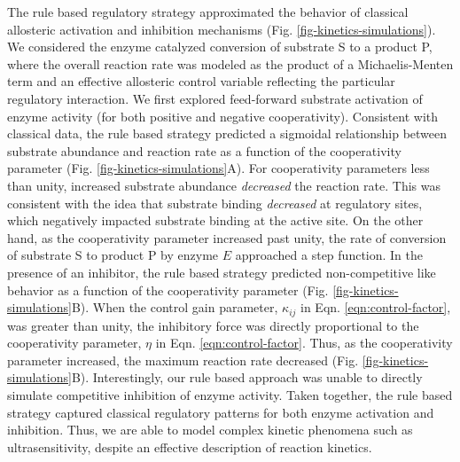 \documentclass[12pt]{article}
\begin{document}
The rule based regulatory strategy approximated the behavior of classical allosteric activation and inhibition mechanisms (Fig. \ref{fig-kinetics-simulations}).  
We considered the enzyme catalyzed conversion of substrate S to a product P, where the overall reaction rate was modeled as the product of a Michaelis-Menten term and an effective 
allosteric control variable reflecting the particular regulatory interaction.
We first explored feed-forward substrate activation of enzyme activity (for both positive and negative cooperativity). 
Consistent with classical data, the rule based strategy predicted a sigmoidal relationship between substrate abundance 
and reaction rate as a function of the cooperativity parameter (Fig. \ref{fig-kinetics-simulations}A). 
For cooperativity parameters less than unity, increased substrate abundance \textit{decreased} the reaction rate. This was consistent with the idea that
substrate binding \textit{decreased} at regulatory sites, which negatively impacted substrate binding at the active site. 
On the other hand, as the cooperativity parameter increased past unity, the rate of conversion of substrate S to product P by enzyme $E$ approached a step function.
In the presence of an inhibitor, the rule based strategy predicted non-competitive like behavior as a function of the 
cooperativity parameter (Fig. \ref{fig-kinetics-simulations}B). 
When the control gain parameter, $\kappa_{ij}$ in Eqn. \eqref{eqn:control-factor}, was greater than unity, the inhibitory force was
directly proportional to the cooperativity parameter, $\eta$ in Eqn. \eqref{eqn:control-factor}. 
Thus, as the cooperativity parameter increased, the maximum reaction rate decreased (Fig. \ref{fig-kinetics-simulations}B).
Interestingly, our rule based approach was unable to directly simulate competitive inhibition of enzyme activity. 
Taken together, the rule based strategy captured classical regulatory patterns for both enzyme activation and inhibition. 
Thus, we are able to model complex kinetic phenomena such as ultrasensitivity, despite an effective description of reaction kinetics. 
    
\end{document}

